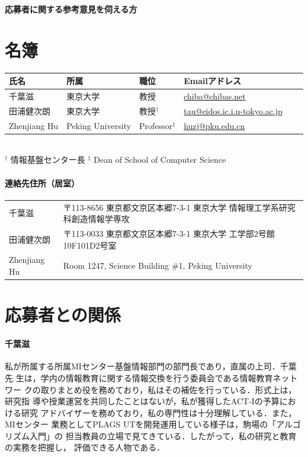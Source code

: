 \documentclass[dvipdfmx]{jsarticle}
\begin{document}
\newpage
\begin{center}
\LARGE\bfseries 応募者に関する参考意見を伺える方
\end{center}
\bigskip

\section*{名簿}
\begin{center}
\begin{tabular}[t]{llllll}
氏名 & 所属 & 職位 & Emailアドレス \\ \hline
千葉滋 & 東京大学 & 教授 & \url{chiba@chibas.net}  \\
田浦健次朗 & 東京大学 & 教授$^\dagger$ & \url{tau@eidos.ic.i.u-tokyo.ac.jp} \\
Zhenjiang Hu & Peking University & Professor$^\ddagger$ & \url{huzj@pku.edu.cn} \\
\end{tabular}
\medskip\\
\noindent
$^\dagger$ 情報基盤センター長
\qquad
\noindent
$^\ddagger$ Dean of School of Computer Science
\end{center}
\paragraph{連絡先住所（居室）}
\begin{center}
\begin{tabular}[t]{ll}
千葉滋 & 〒113-8656 東京都文京区本郷7-3-1 東京大学 情報理工学系研究科創造情報学専攻 \\
田浦健次朗 & 〒113-0033 東京都文京区本郷7-3-1 東京大学 工学部2号館10F101D2号室 \\
Zhenjiang Hu & Room 1247, Science Building \#1, Peking University \\
\end{tabular}
\end{center}

\section*{応募者との関係}
\paragraph{千葉滋}
私が所属する所属MIセンター基盤情報部門の部門長であり，直属の上司．千葉先
生は，学内の情報教育に関する情報交換を行う委員会である情報教育ネットワー
クの取りまとめ役を務めており，私はその補佐を行っている．形式上は，研究指
導や授業運営を共同したことはないが，私が獲得したACT-Iの予算における研究
アドバイザーを務めており，私の専門性は十分理解している．また，MIセンター
業務としてPLAGS UTを開発運用している様子は，駒場の「アルゴリズム入門」の
担当教員の立場で見てきている．したがって，私の研究と教育の実務を把握し，
評価できる人物である．
\end{document}
